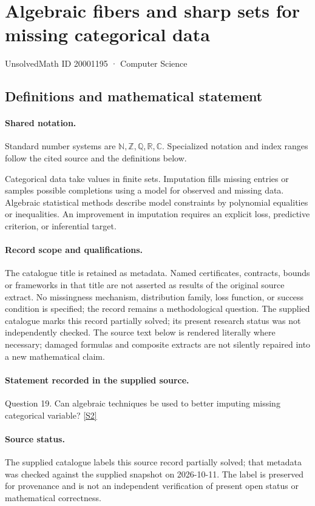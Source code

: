 \documentclass[11pt]{article}
\newcommand{\sref}[2]{\hyperlink{source:#1:#2}{[S#2]}}
\begin{document}
\setcounter{section}{20001194}
\section{Algebraic fibers and sharp sets for missing categorical data}\label{20001195}
{\small\sffamily UnsolvedMath ID 20001195 · Computer Science}
\subsection{Definitions and mathematical statement}

\paragraph{Shared notation.}Standard number systems are $\mathbb N,\mathbb Z,\mathbb Q,\mathbb R,\mathbb C$. Specialized notation and index ranges follow the cited source and the definitions below.


Categorical data take values in finite sets. Imputation fills missing entries or samples possible completions using a model for observed and missing data. Algebraic statistical methods describe model constraints by polynomial equalities or inequalities. An improvement in imputation requires an explicit loss, predictive criterion, or inferential target.
\paragraph{Record scope and qualifications.}
The catalogue title is retained as metadata. Named certificates, contracts, bounds or frameworks in that title are not asserted as results of the original source extract.
No missingness mechanism, distribution family, loss function, or success condition is specified; the record remains a methodological question. The supplied catalogue marks this record partially solved; its present research status was not independently checked.
The source text below is rendered literally where necessary; damaged formulas and composite extracts are not silently repaired into a new mathematical claim.
\paragraph{Statement recorded in the supplied source.}
Question 19. Can algebraic techniques be used to better imputing missing categorical variable? \sref{20001195}{2}
\paragraph{Source status.}
The supplied catalogue labels this source record partially solved; that metadata was checked against the supplied snapshot on 2026-10-11. The label is preserved for provenance and is not an independent verification of present open status or mathematical correctness.
\end{document}
